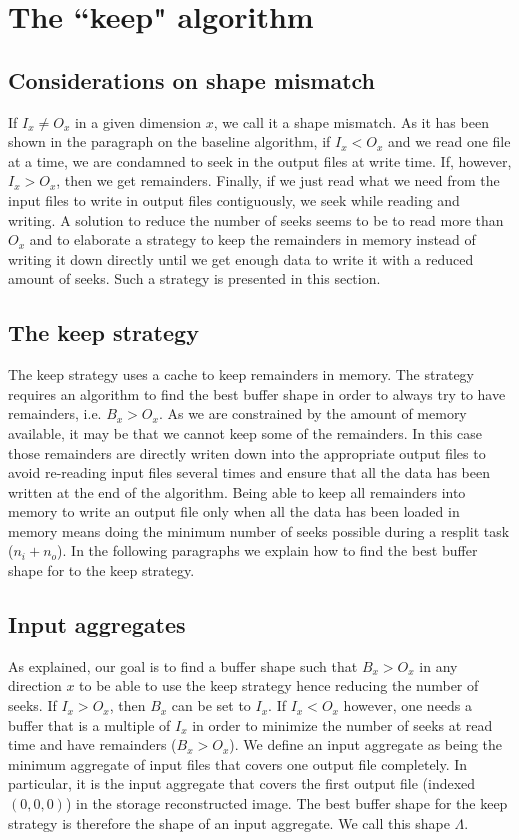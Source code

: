 \documentclass[conference]{IEEEtran}
\begin{document}
\section{The ``keep" algorithm}

\subsection{Considerations on shape mismatch}
If $I_x \neq O_x$ in a given dimension $x$, we call it a shape mismatch. As it
has been shown in the paragraph on the baseline algorithm, if $I_x < O_x$ and
we read one file at a time, we are condamned to seek in the output files at
write time. If, however, $I_x > O_x$, then we get remainders. Finally, if we
just read what we need from the input files to write in output files
contiguously, we seek while reading and writing. A solution to reduce the
number of seeks seems to be to read more than $O_x$ and to elaborate a strategy
to keep the remainders in memory instead of writing it down directly until we
get enough data to write it with a reduced amount of seeks. Such a strategy is
presented in this section.

\subsection{The keep strategy}
The keep strategy uses a cache to keep remainders in memory.
The strategy requires an algorithm to find the best buffer shape in order to
always try to have remainders, i.e. $B_x>O_x$. As we are constrained by the
amount of memory available, it may be that we cannot keep some of the remainders.
In this case those remainders are directly writen down into the appropriate
output files to avoid re-reading input files several times and ensure that all
the data has been written at the end of the algorithm. Being able to keep all
remainders into memory to write an output file only when all the data has been
loaded in memory means doing the minimum number of seeks possible during a
resplit task ($n_i + n_o$). In the following paragraphs we explain how to find
the best buffer shape for to the keep strategy.

\subsection{Input aggregates}
As explained, our goal is to find a buffer shape such that $B_x>O_x$ in any
direction $x$ to be able to use the keep strategy hence reducing the number of
seeks. If $I_x > O_x$, then $B_x$ can be set to $I_x$. If $I_x < O_x$ however,
one needs a buffer that is a multiple of $I_x$ in order to minimize the number
of seeks at read time and have remainders ($B_x>O_x$). We define an input
aggregate as being the minimum aggregate of input files that covers one output
file completely. In particular, it is the input aggregate that covers the first
output file (indexed $(0,0,0)$) in the storage reconstructed image. The best
buffer shape for the keep strategy is therefore the shape of an input aggregate.
We call this shape $\Lambda$.
\end{document}
